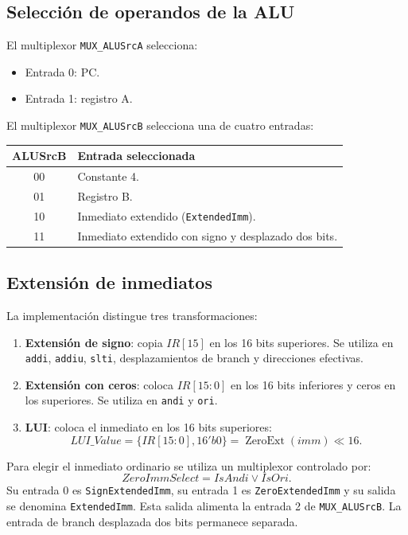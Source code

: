 \documentclass[11pt,a4paper]{article}
\begin{document}
\subsection{Selección de operandos de la ALU}

El multiplexor \texttt{MUX\_ALUSrcA} selecciona:
\begin{itemize}
  \item Entrada 0: PC.
  \item Entrada 1: registro A.
\end{itemize}

El multiplexor \texttt{MUX\_ALUSrcB} selecciona una de cuatro entradas:
\begin{center}
\begin{tabularx}{0.9\textwidth}{cX}
\toprule
\textbf{ALUSrcB} & \textbf{Entrada seleccionada} \\
\midrule
00 & Constante 4. \\
01 & Registro B. \\
10 & Inmediato extendido (\texttt{ExtendedImm}). \\
11 & Inmediato extendido con signo y desplazado dos bits. \\
\bottomrule
\end{tabularx}
\end{center}

\subsection{Extensión de inmediatos}

La implementación distingue tres transformaciones:
\begin{enumerate}
  \item \textbf{Extensión de signo}: copia $IR[15]$ en los 16 bits superiores. Se utiliza en \texttt{addi}, \texttt{addiu}, \texttt{slti}, desplazamientos de branch y direcciones efectivas.
  \item \textbf{Extensión con ceros}: coloca $IR[15:0]$ en los 16 bits inferiores y ceros en los superiores. Se utiliza en \texttt{andi} y \texttt{ori}.
  \item \textbf{LUI}: coloca el inmediato en los 16 bits superiores:
  \[
    LUI\_Value = \{IR[15:0],16'b0\}= \operatorname{ZeroExt}(imm)\ll16.
  \]
\end{enumerate}

Para elegir el inmediato ordinario se utiliza un multiplexor controlado por:
\[
  ZeroImmSelect = IsAndi \lor IsOri.
\]
Su entrada 0 es \texttt{SignExtendedImm}, su entrada 1 es \texttt{ZeroExtendedImm} y su salida se denomina \texttt{ExtendedImm}. Esta salida alimenta la entrada 2 de \texttt{MUX\_ALUSrcB}. La entrada de branch desplazada dos bits permanece separada.
\end{document}
